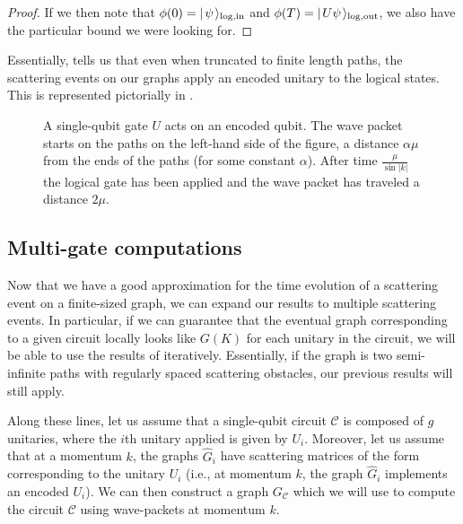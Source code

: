 \documentclass[../thesis-main/thesis-main]{subfiles}
\begin{document}
\begin{proof}
If we then note that $\phi(0) = |\mspace{2mu} \psi \mspace{2mu} \rangle_{\text{log},\text{in}}$ and $\phi(T) = |\mspace{2mu} U \psi \mspace{2mu} \rangle_{\text{log},\text{out}}$, we also have the particular bound we were looking for.
\end{proof}

Essentially,  tells us that even when truncated to finite length paths, the scattering events on our graphs apply an encoded unitary to the logical states.  This is represented pictorially in .
 
\begin{figure}
  \centering
  
  \caption[Single-qubit quantum walk cartoon]{A single-qubit gate $U$ acts on an encoded qubit. The wave packet starts on the paths on the left-hand side of the figure, a distance $\alpha\mu$ from the ends of the paths (for some constant $\alpha$). After time $\frac{\mu}{\sin |k|}$ the logical gate has been applied and the wave packet has traveled a distance $2\mu$.}
  \label{fig:single_particle_cartoon}
\end{figure}


\subsection{Multi-gate computations}\label{sec:single_qubit_multi_gate_computation}

Now that we have a good approximation for the time evolution of a scattering event on a finite-sized graph, we can expand our results to multiple scattering events.  In particular, if we can guarantee that the eventual graph corresponding to a given circuit locally looks like $G(K)$ for each unitary in the circuit, we will be able to use the results of  iteratively.  Essentially, if the graph is two semi-infinite paths with regularly spaced scattering obstacles, our previous results will still apply.


Along these lines, let us assume that a single-qubit circuit $\mathcal{C}$ is composed of $g$ unitaries, where the $i$th unitary applied is given by $U_i$.  Moreover, let us assume that at a momentum $k$, the graphs $\widehat{G}_i$ have scattering matrices of the form  corresponding to the unitary $U_i$ (i.e., at momentum $k$, the graph $\widehat{G}_i$ implements an encoded $U_i$).  We can then construct a graph $G_{\mathcal{C}}$ which we will use to compute the circuit $\mathcal{C}$ using wave-packets at momentum $k$. 
\end{document}
